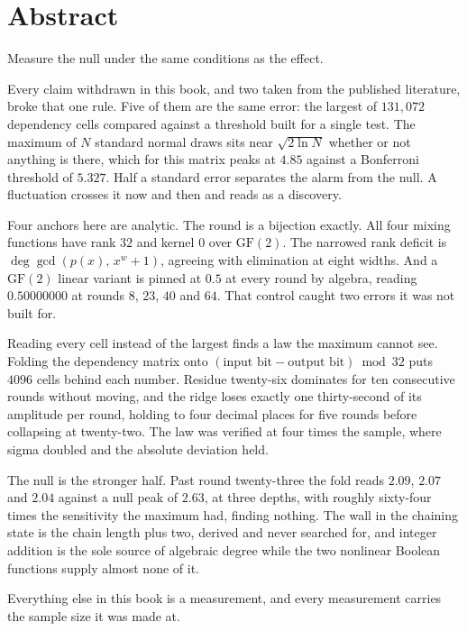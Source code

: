 \chapter*{Abstract}

Measure the null under the same conditions as the effect.

Every claim withdrawn in this book, and two taken from the published literature, broke that one rule.
Five of them are the same error: the largest of $131{,}072$ dependency cells compared against a
threshold built for a single test. The maximum of $N$ standard normal draws sits near
$\sqrt{2 \ln N}$ whether or not anything is there, which for this matrix peaks at $4.85$ against a
Bonferroni threshold of $5.327$. Half a standard error separates the alarm from the null.
A fluctuation crosses it now and then and reads as a discovery.

Four anchors here are analytic. The round is a bijection exactly. All four
mixing functions have rank $32$ and kernel $0$ over $\mathrm{GF}(2)$. The narrowed rank deficit is
$\deg \gcd(p(x),\, x^w + 1)$, agreeing with elimination at eight widths. And a $\mathrm{GF}(2)$
linear variant is pinned at $0.5$ at every round by algebra, reading $0.50000000$ at rounds $8$,
$23$, $40$ and $64$. That control caught two errors it was not built for.

Reading every cell instead of the largest finds a law the maximum cannot see. Folding the dependency
matrix onto $(\text{input bit} - \text{output bit}) \bmod 32$ puts $4096$ cells behind each number.
Residue twenty-six dominates for ten consecutive rounds without moving, and the ridge loses exactly
one thirty-second of its amplitude per round, holding to four decimal places for five rounds before
collapsing at twenty-two. The law was verified at four times the sample, where sigma doubled and the
absolute deviation held.

The null is the stronger half. Past round twenty-three the fold reads $2.09$, $2.07$ and $2.04$
against a null peak of $2.63$, at three depths, with roughly sixty-four times the sensitivity the
maximum had, finding nothing. The wall in the chaining state is the chain length plus two, derived
and never searched for, and integer addition is the sole source of algebraic degree while the two
nonlinear Boolean functions supply almost none of it.

Everything else in this book is a measurement, and every measurement carries the sample size it was
made at.
\cleardoublepage
